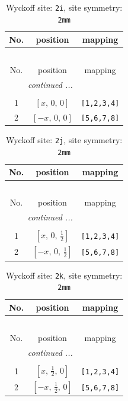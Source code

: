 \documentclass[fleqn,8pt]{jsarticle}
\begin{document}
\renewcommand{\arraystretch}{1.2}
\begin{longtable}{ccc}
\caption{Wyckoff site: {\tt 2i}, site symmetry: {\tt 2mm}}
 \\
 \hline \hline
No. & position & mapping \\ \hline \endfirsthead

\multicolumn{2}{l}{\tablename\ \thetable{}} \\
 \hline \hline
No. & position & mapping \\ \hline \endhead

 \hline \hline
\multicolumn{2}{r}{\footnotesize\it continued ...} \\ \endfoot

 \hline \hline
\multicolumn{2}{r}{} \\ \endlastfoot

1 & $\left[ x,\, 0,\, 0 \right]$ & {\tt [1,2,3,4]} \\ \hline
2 & $\left[ - x,\, 0,\, 0 \right]$ & {\tt [5,6,7,8]} \\
\end{longtable}
\renewcommand{\arraystretch}{1.2}
\begin{longtable}{ccc}
\caption{Wyckoff site: {\tt 2j}, site symmetry: {\tt 2mm}}
 \\
 \hline \hline
No. & position & mapping \\ \hline \endfirsthead

\multicolumn{2}{l}{\tablename\ \thetable{}} \\
 \hline \hline
No. & position & mapping \\ \hline \endhead

 \hline \hline
\multicolumn{2}{r}{\footnotesize\it continued ...} \\ \endfoot

 \hline \hline
\multicolumn{2}{r}{} \\ \endlastfoot

1 & $\left[ x,\, 0,\, \frac{1}{2} \right]$ & {\tt [1,2,3,4]} \\ \hline
2 & $\left[ - x,\, 0,\, \frac{1}{2} \right]$ & {\tt [5,6,7,8]} \\
\end{longtable}
\renewcommand{\arraystretch}{1.2}
\begin{longtable}{ccc}
\caption{Wyckoff site: {\tt 2k}, site symmetry: {\tt 2mm}}
 \\
 \hline \hline
No. & position & mapping \\ \hline \endfirsthead

\multicolumn{2}{l}{\tablename\ \thetable{}} \\
 \hline \hline
No. & position & mapping \\ \hline \endhead

 \hline \hline
\multicolumn{2}{r}{\footnotesize\it continued ...} \\ \endfoot

 \hline \hline
\multicolumn{2}{r}{} \\ \endlastfoot

1 & $\left[ x,\, \frac{1}{2},\, 0 \right]$ & {\tt [1,2,3,4]} \\ \hline
2 & $\left[ - x,\, \frac{1}{2},\, 0 \right]$ & {\tt [5,6,7,8]} \\
\end{longtable}
\end{document}
